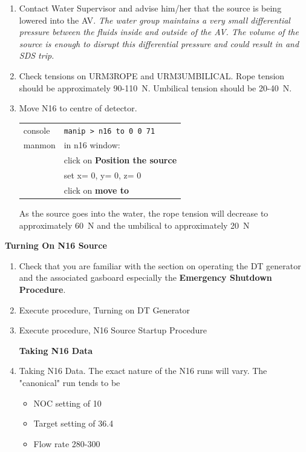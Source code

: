 \documentclass[10pt]{article}
\begin{document}
\begin{enumerate}
\item \CheckBox[name=n16c1]{} Contact Water Supervisor and advise him/her that the source is being lowered into the AV. {\it The water group maintains a very small differential pressure between the fluids inside and outside of the AV. The volume of the source is enough to disrupt this differential pressure and could result in and SDS trip.}
\item \CheckBox[name=n16c2]{} Check tensions on URM3ROPE and URM3UMBILICAL. Rope tension should be approximately 90-110~N. Umbilical tension should be 20-40~N.
\item \CheckBox[name=n16c3]{} Move N16 to centre of detector.
	\begin{center}
	\begin{tabular}{|l|l|}
	\hline
	console & \verb+manip > n16 to 0 0 71+ \\
	manmon & in n16 window: \\
	& click on {\bf Position the source} \\
	& set x= 0, y= 0, z= 0 \\
	& click on {\bf move to} \\
	\hline
	\end{tabular}
	\end{center}
As the source goes into the water, the rope tension will decrease to approximately 60~N and the umbilical to approximately 20~N
\end{enumerate}

{\bf Turning On N16 Source}

\begin{enumerate}
\item \CheckBox[name=n16t1]{} Check that you are familiar with the section on operating the DT generator and the associated gasboard especially the {\bf Emergency Shutdown Procedure}.
\item \CheckBox[name=n16t2]{} Execute procedure, Turning on DT Generator
\item \CheckBox[name=n16t3]{} Execute procedure, N16 Source Startup Procedure

{\bf Taking N16 Data}

\item \CheckBox[name=n16t4]{} Taking N16 Data. The exact nature of the N16 runs will vary. The "canonical" run tends to be 
\begin{itemize}
\item NOC setting of 10
\item Target setting of 36.4
\item Flow rate 280-300
\end{itemize}
\end{enumerate}
\end{document}
